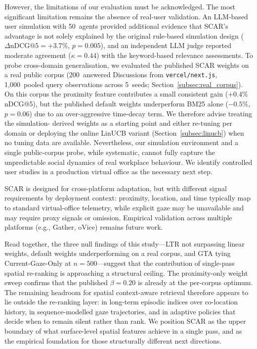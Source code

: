 \documentclass[journal]{IEEEtran}
\begin{document}
However, the limitations of our evaluation must be acknowledged.
The most significant limitation remains the absence of real-user validation.
An LLM-based user simulation with 50~agents provided additional evidence that
SCAR's advantage is not solely explained by the original rule-based simulation
design ($\Delta\text{nDCG@5} = +3.7\%$, $p = 0.005$), and an independent LLM
judge reported moderate agreement ($\kappa = 0.44$) with the keyword-based
relevance assessments. To probe cross-domain generalisation, we evaluated the
published SCAR weights on a real public corpus (200~answered Discussions
from \texttt{vercel/next.js}, 1{,}000~pooled query observations across 5~seeds;
Section~\ref{subsec:real_corpus}). On this corpus the proximity feature
contributes a small consistent gain ($+0.4\%$ nDCG@5), but the published
default weights underperform BM25 alone ($-0.5\%$, $p = 0.06$) due to an
over-aggressive time-decay term. We therefore advise treating the simulation-
derived weights as a starting point and either re-tuning per domain or
deploying the online LinUCB variant (Section~\ref{subsec:linucb}) when no
tuning data are available.
Nevertheless, our simulation environment and a single public-corpus probe,
while systematic, cannot fully capture the unpredictable social dynamics of
real workplace behaviour. We identify controlled user studies in a production
virtual office as the necessary next step.

SCAR is designed for cross-platform adaptation, but with different signal requirements by deployment context: proximity, location, and time typically map to standard virtual-office telemetry, while explicit gaze may be unavailable and may require proxy signals or omission. Empirical validation across multiple platforms (e.g., Gather, oVice) remains future work.

Read together, the three null findings of this study---LTR not surpassing
linear weights, default weights underperforming on a real corpus, and GTA
tying Current-Gaze-Only at $n{=}500$---suggest that the contribution of
single-pass spatial re-ranking is approaching a structural ceiling. The
proximity-only weight sweep confirms that the published $\beta = 0.20$ is
already at the per-corpus optimum. The remaining headroom for spatial
context-aware retrieval therefore appears to lie outside the re-ranking
layer: in long-term episodic indices over co-location history, in
sequence-modelled gaze trajectories, and in adaptive policies that decide
when to remain silent rather than rank. We position SCAR as the upper
boundary of what surface-level spatial features achieve in a single pass,
and as the empirical foundation for those structurally different next
directions.
\end{document}
